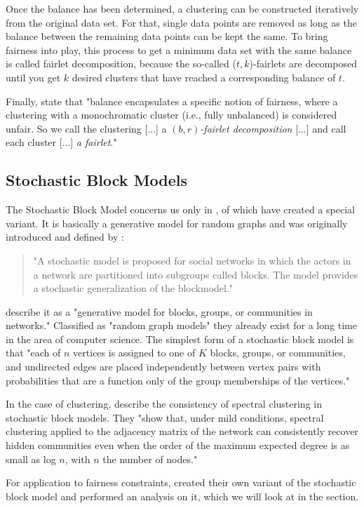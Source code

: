 Once the balance has been determined, a clustering can be constructed iteratively from the original data set. For that, single data points are removed as long as the balance between the remaining data points can be kept the same. To bring fairness into play, this process to get a minimum data set with the same balance is called fairlet decomposition, because the so-called ($t, k$)-fairlets are decomposed until you get $k$ desired clusters that have reached a corresponding balance of $t$. \autocite[4]{Chierichetti2018}

Finally, \textcite[4]{Chierichetti2018} state that "balance encapsulates a specific notion of fairness, where a clustering with a monochromatic cluster (i.e., fully unbalanced) is considered unfair. So we call the clustering [...] a $(b, r)$\textit{-fairlet decomposition} [...] and call each cluster [...] \textit{a fairlet}." \autocite[4]{Chierichetti2018}


\subsection{Stochastic Block Models}

The Stochastic Block Model concerns us only in , of which \textcite{Kleindessner2019} have created a special variant. It is basically a generative model for random graphs and was originally introduced and defined by \textcite[]{Holland1983}:

\begin{quote}
"A stochastic model is proposed for social networks in which the actors in a network are partitioned into subgroups called blocks. The model provides a stochastic generalization of the blockmodel."
\autocite[1]{Holland1983}
\end{quote}

\textcite[1]{Karrer2010StochasticNetworks} describe it as a "generative model for blocks, groups, or communities in networks." Classified as "random graph models" they already exist for a long time in the area of computer science.
The simplest form of a stochastic block model is that "each of $n$ vertices is assigned to one of $K$ blocks, groups, or communities, and undirected edges are placed independently between vertex pairs with probabilities that are a function only of the group memberships of the vertices." \autocite[1]{Karrer2010StochasticNetworks}

In the case of clustering, \textcite[]{Lei2013} describe the consistency of spectral clustering in stochastic block models. They "show that, under mild conditions, spectral clustering applied to the adjacency matrix of the network can consistently recover hidden communities even when the order of the maximum expected degree is as small as log $n$, with $n$ the number of nodes." \autocite[1]{Lei2013}

For application to fairness constraints, \textcite[4]{Kleindessner2019} created their own variant of the stochastic block model and performed an analysis on it, which we will look at in the  section.